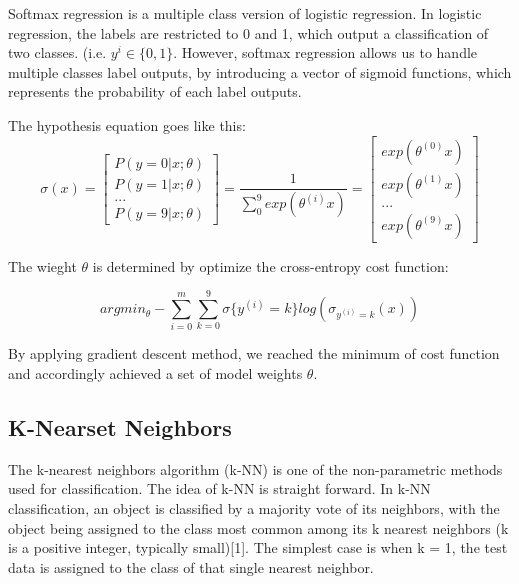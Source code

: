 \documentclass{article}
\begin{document}
Softmax regression is a multiple class version of logistic regression.
In logistic regression, the labels are restricted to 0 and 1, which output a classification of two classes. (i.e. $y^i \in \{0,1\}$. However, softmax regression allows us to handle multiple classes label outputs, by introducing a vector of sigmoid functions, which represents the probability of each label outputs.

The hypothesis equation goes like this: 
\begin{equation}
\sigma(x) = \left[
 \begin{matrix}
   P(y=0|x;\theta)\\
  P(y=1|x;\theta)\\
  ...\\
   P(y=9|x;\theta)
  \end{matrix}
  \right]
  =\frac{1}{\sum_0^9 exp(\theta^{(i)}x)}
  =\left[
 \begin{matrix}
  exp(\theta^{(0)}x)\\
  exp(\theta^{(1)}x)\\
  ...\\
  exp(\theta^{(9)}x)
  \end{matrix}
  \right]
\end{equation}

The wieght $\theta$ is determined by optimize the cross-entropy cost function:

\begin{equation}
arg min_{\theta}  -\sum_{i=0}^{m} \sum_{k=0}^{9} \sigma\{y^{(i)}=k\} log( \sigma_{y^{(i)}=k} (x) ) 
\end{equation}

By applying gradient descent method, we reached the minimum
of cost function and accordingly achieved a set of
model weights $\theta$.

\subsection{K-Nearset Neighbors}

The k-nearest neighbors algorithm (k-NN) is one of the non-parametric methods used for classification. The idea of k-NN is straight forward. In k-NN classification, an object is classified by a majority vote of its neighbors, with the object being assigned to the class most common among its k nearest neighbors (k is a positive integer, typically small)[1]. The simplest case is when k = 1, the test data is assigned to the class of that single nearest neighbor.
\end{document}
